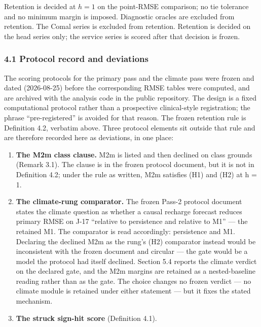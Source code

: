 \documentclass[11pt]{article}
\providecommand{\tightlist}{\setlength{\itemsep}{0pt}\setlength{\parskip}{0pt}}
\begin{document}
Retention is decided at \(h=1\) on the point-RMSE comparison; no tie
tolerance and no minimum margin is imposed. Diagnostic oracles are
excluded from retention. The Comal series is excluded from retention.
Retention is decided on the head series only; the service series is
scored after that decision is frozen.

\subsubsection{4.1 Protocol record and
deviations}\label{protocol-record-and-deviations}

The scoring protocols for the primary pass and the climate pass were
frozen and dated (2026-08-25) before the corresponding RMSE tables were
computed, and are archived with the analysis code in the public
repository. The design is a fixed computational protocol rather than a
prospective clinical-style registration; the phrase ``pre-registered''
is avoided for that reason. The frozen retention rule is Definition 4.2,
verbatim above. Three protocol elements sit outside that rule and are
therefore recorded here as deviations, in one place:

\begin{enumerate}
\def\labelenumi{\arabic{enumi}.}
\tightlist
\item
  \textbf{The M2m class clause.} M2m is listed and then declined on
  class grounds (Remark 3.1). The clause is in the frozen protocol
  document, but it is not in Definition 4.2; under the rule as written,
  M2m satisfies (H1) and (H2) at h = 1.
\item
  \textbf{The climate-rung comparator.} The frozen Pass-2 protocol
  document states the climate question as whether a causal recharge
  forecast reduces primary RMSE on J-17 ``relative to persistence and
  relative to M1'' --- the retained M1. The comparator is read
  accordingly: persistence and M1. Declaring the declined M2m as the
  rung's (H2) comparator instead would be inconsistent with the frozen
  document and circular --- the gate would be a model the protocol had
  itself declined. Section 5.4 reports the climate verdict on the
  declared gate, and the M2m margins are retained as a nested-baseline
  reading rather than as the gate. The choice changes no frozen verdict
  --- no climate module is retained under either statement --- but it
  fixes the stated mechanism.
\item
  \textbf{The struck sign-hit score} (Definition 4.1).
\end{enumerate}
\end{document}
